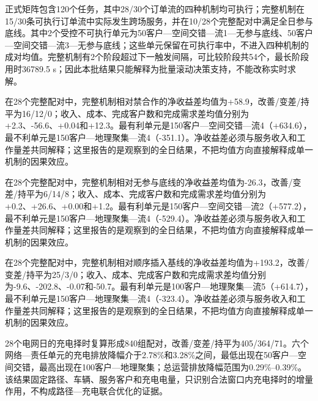 正式矩阵包含120个任务，其中28/30个订单流的四种机制均可执行；完整机制在15/30条可执行订单流中实际发生跨场服务，并在10/28个完整配对中满足全日参与底线。其中2个受控不可执行单元为50客户—空间交错—流1—无参与底线、50客户—空间交错—流3—无参与底线；这些单元保留在可执行率中，不进入四种机制的成对均值。完整机制有2个阶段超过下一触发间隔，可比较阶段共54个，最长阶段用时36789.5 s；因此本批结果只能解释为批量滚动决策支持，不能改称实时求解。

在28个完整配对中，完整机制相对禁合作的净收益差均值为+58.9，改善/变差/持平为16/12/0；收入、成本、完成客户数和完成需求差均值分别为+2.3、-56.6、+0.04和+12.3。最有利单元是150客户—空间交错—流4（+634.6），最不利单元是150客户—地理聚集—流4（-351.1）。净收益差必须与服务收入和工作量差共同解释；这里报告的是观察到的全日结果，不把均值方向直接解释成单一机制的因果效应。

在28个完整配对中，完整机制相对无参与底线的净收益差均值为-26.3，改善/变差/持平为6/14/8；收入、成本、完成客户数和完成需求差均值分别为+0.2、+26.6、+0.00和+1.2。最有利单元是150客户—空间交错—流2（+577.2），最不利单元是150客户—地理聚集—流4（-529.4）。净收益差必须与服务收入和工作量差共同解释；这里报告的是观察到的全日结果，不把均值方向直接解释成单一机制的因果效应。

在28个完整配对中，完整机制相对顺序插入基线的净收益差均值为+193.2，改善/变差/持平为25/3/0；收入、成本、完成客户数和完成需求差均值分别为-9.6、-202.8、-0.07和-50.7。最有利单元是100客户—地理聚集—流5（+614.7），最不利单元是150客户—地理聚集—流4（-323.4）。净收益差必须与服务收入和工作量差共同解释；这里报告的是观察到的全日结果，不把均值方向直接解释成单一机制的因果效应。

28个电网日的充电择时复算形成840组配对，改善/变差/持平为405/364/71。六个网络—责任单元的充电排放降幅介于2.78\%和3.28\%之间，最低出现在50客户—空间交错，最高出现在100客户—地理聚集；总运营排放降幅范围为0.29\%--0.39\%。该结果固定路径、车辆、服务客户和充电电量，只识别合法窗口内充电择时的增量作用，不构成路径—充电联合优化的证据。
